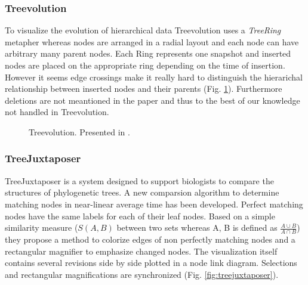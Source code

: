 \subsubsection{Treevolution\cite{theron2006hierarchical}} To visualize the evolution of hierarchical data Treevolution uses a \emph{TreeRing} metapher whereas nodes are arranged in a radial layout and each node can have arbitrary many parent nodes. Each Ring represents one snapshot and inserted nodes are placed on the appropriate ring depending on the time of insertion. However it seems edge crossings make it really hard to distinguish the hierarichal relationship between inserted nodes and their parents (Fig. \ref{fig:treevolution}). Furthermore deletions are not meantioned in the paper and thus to the best of our knowledge not handled in Treevolution.

\begin{figure}[tb]
\caption{\label{fig:treevolution} Treevolution. Presented in \cite{theron2006hierarchical}.}
\end{figure}

\subsubsection{TreeJuxtaposer\cite{munzner2003treejuxtaposer}}
TreeJuxtaposer is a system designed to support biologists to compare the structures of phylogenetic trees. A new comparsion algorithm to determine matching nodes in near-linear average time has been developed. Perfect matching nodes have the same labels for each of their leaf nodes. Based on a simple similarity measure ($S(A,B)$ between two sets whereas A, B is defined as $\frac{A \cup B}{A \cap B}$) they propose a method to colorize edges of non perfectly matching nodes and a rectangular magnifier to emphasize changed nodes. The visualization itself contains several revisions side by side plotted in a node link diagram. Selections and rectangular magnifications are synchronized (Fig. \ref{fig:treejuxtaposer}).

